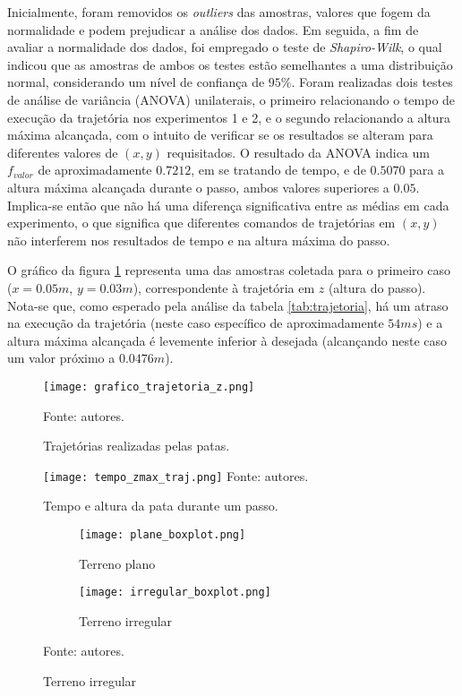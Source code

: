 \documentclass[../main.tex]{subfiles}
\begin{document}
  Inicialmente, foram removidos os \textit{outliers} das amostras, valores que fogem da normalidade e podem prejudicar a análise dos dados. Em seguida, a fim de avaliar a normalidade dos dados, foi empregado o teste de \textit{Shapiro-Wilk}, o qual indicou que as amostras de ambos os testes estão semelhantes a uma distribuição normal, considerando um nível de confiança de $95\%$.  Foram realizadas dois testes de análise de variância (ANOVA) unilaterais, o primeiro relacionando o tempo de execução da trajetória nos experimentos 1 e 2, e o segundo relacionando a altura máxima alcançada, com o intuito de verificar se os resultados se alteram para diferentes valores de $(x, y)$ requisitados. O resultado da ANOVA indica um $f_{valor}$ de aproximadamente $0.7212$, em se tratando de tempo, e de $0.5070$ para a altura máxima alcançada durante o passo, ambos valores superiores a $0.05$. Implica-se então que não há uma diferença significativa entre as médias em cada experimento, o que significa que diferentes comandos de trajetórias em $(x, y)$ não interferem nos resultados de tempo e na altura máxima do passo.

  O gráfico da figura \ref{fig:grafico_trajetoria_xyz} representa uma das amostras coletada para o primeiro caso ($x=0.05m$, $y=0.03m$), correspondente à trajetória em $z$ (altura do passo). Nota-se que, como esperado pela análise da tabela \ref{tab:trajetoria}, há um atraso na execução da trajetória (neste caso específico de aproximadamente $54ms$) e a altura máxima alcançada é levemente inferior à desejada (alcançando neste caso um valor próximo a $0.0476m$).

  \begin{figure}[!htb]
    \centering
    \caption{Trajetórias realizadas pelas patas.}
    \texttt{[image: grafico\_trajetoria\_z.png]}
  
    Fonte: autores.
    \label{fig:grafico_trajetoria_xyz}
  \end{figure}

  \begin{figure}
    \centering
    \caption{Tempo e altura da pata durante um passo.}
    \texttt{[image: tempo\_zmax\_traj.png]}
    Fonte: autores.
    \label{fig:time_zmax_traj}
  \end{figure}

  \begin{figure}[!htb]
    \centering
    \caption{Oscilação do corpo em ambos os tipos de terreno.}
    \begin{subfigure}[t]{0.49\textwidth}
      \centering
      \texttt{[image: plane\_boxplot.png]}
      \caption{Terreno plano}
      \label{fig:imu_test_plane}
    \end{subfigure}
    \begin{subfigure}[t]{0.49\textwidth}
      \centering
      \texttt{[image: irregular\_boxplot.png]}
      \caption{Terreno irregular}
      \label{fig:imu_test_irregular}
    \end{subfigure}
    
    Fonte: autores.
    \label{fig:imu_test}
  \end{figure}
\end{document}
